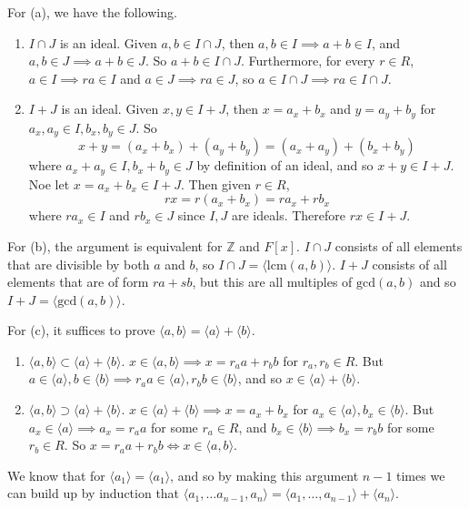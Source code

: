   \begin{solution}
    For (a), we have the following. 
    \begin{enumerate}
      \item $I \cap J$ is an ideal. Given $a, b \in I \cap J$, then $a, b \in I \implies a + b \in I$, and $a, b \in J \implies a + b \in J$. So $a + b \in I \cap J$. Furthermore, for every $r \in R$, $a \in I \implies r a \in I$ and $a \in J \implies r a \in J$, so $a \in I \cap J \implies ra \in I \cap J$. 

      \item $I + J$ is an ideal. Given $x, y \in I + J$, then $x = a_x + b_x$ and $y = a_y + b_y$ for $a_x, a_y \in I, b_x, b_y \in J$. So 
      \begin{equation}
        x + y = (a_x + b_x) + (a_y + b_y) = (a_x + a_y) + (b_x + b_y)
      \end{equation}
      where $a_x + a_y \in I, b_x + b_y \in J$ by definition of an ideal, and so $x + y \in I + J$. Noe let $x = a_x + b_x \in I + J$. Then given $r \in R$,
      \begin{equation}
        rx = r(a_x + b_x) = r a_x + r b_x
      \end{equation}
      where $r a_x \in I$ and $r b_x \in J$ since $I, J$ are ideals. Therefore $rx \in I + J$.  
    \end{enumerate}
    For (b), the argument is equivalent for $\mathbb{Z}$ and $F[x]$. $I \cap J$ consists of all elements that are divisible by both $a$ and $b$, so $I \cap J = \langle \mathrm{lcm}(a, b) \rangle$. $I + J$ consists of all elements that are of form $r a + s b$, but this are all multiples of $\mathrm{gcd}(a, b)$ and so $I + J = \langle \mathrm{gcd}(a, b) \rangle$. 

    For (c), it suffices to prove $\langle a, b \rangle = \langle a \rangle + \langle b \rangle$. 
    \begin{enumerate}
      \item $\langle a, b \rangle \subset \langle a \rangle + \langle b \rangle$. $x \in \langle a, b \rangle \implies x = r_a a + r_b b$ for $r_a, r_b \in R$. But $a \in \langle a \rangle, b \in \langle b \rangle \implies r_a a \in \langle a \rangle, r_b b \in \langle b \rangle$, and so $x \in \langle a \rangle + \langle b \rangle$. 

    \item $\langle a, b \rangle \supset \langle a \rangle + \langle b \rangle$. $x \in \langle a \rangle + \langle b \rangle \implies x = a_x + b_x$ for $a_x \in \langle a \rangle, b_x \in \langle b \rangle$. But $a_x \in \langle a \rangle \implies a_x = r_a a$ for some $r_a \in R$, and $b_x \in \langle b \rangle \implies b_x = r_b b$ for some $r_b \in R$. So $x = r_a a + r_b b \iff x \in \langle a, b \rangle$. 
    \end{enumerate}
    We know that for $\langle a_1 \rangle = \langle a_1 \rangle$, and so by making this argument $n-1$ times we can build up by induction that $\langle a_1, \ldots a_{n-1}, a_n \rangle = \langle a_1, \ldots, a_{n-1} \rangle + \langle a_n \rangle$. 
  \end{solution}

